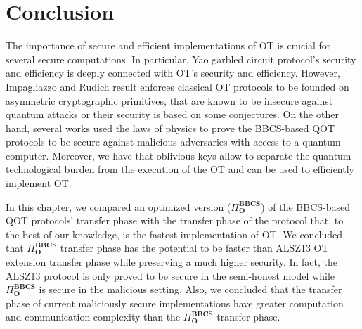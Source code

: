 \section{Conclusion}

The importance of secure and efficient implementations of OT is crucial for several secure computations. In particular, Yao garbled circuit protocol's security and efficiency is deeply connected with OT's security and efficiency. However, Impagliazzo and Rudich result enforces classical OT protocols to be founded on asymmetric cryptographic primitives, that are known to be insecure against quantum attacks or their security is based on some conjectures. On the other hand, several works \cite{Lemus20,BCKM21, GLSV21,U10} used the laws of physics to prove the BBCS-based QOT protocols to be secure against malicious adversaries with access to a quantum computer. Moreover, we have that oblivious keys allow to separate the quantum technological burden from the execution of the OT and can be used to efficiently implement OT.

In this chapter, we compared an optimized version ($\Pi^{\textbf{BBCS}}_{\textbf{O}}$) of the BBCS-based QOT protocols' transfer phase with the transfer phase of the protocol that, to the best of our knowledge, is the fastest implementation of OT\cite{ALSZ13}. We concluded that $\Pi^{\textbf{BBCS}}_{\textbf{O}}$ transfer phase has the potential to be faster than ALSZ13 OT extension transfer phase while preserving a much higher security. In fact, the ALSZ13 protocol is only proved to be secure in the semi-honest model while $\Pi^{\textbf{BBCS}}_{\textbf{O}}$ is secure in the malicious setting. Also, we concluded that the transfer phase of current maliciously secure implementations \cite{ALSZ15, KOS15} have greater computation and communication complexity than the $\Pi^{\textbf{BBCS}}_{\textbf{O}}$ transfer phase.

%
%
%
